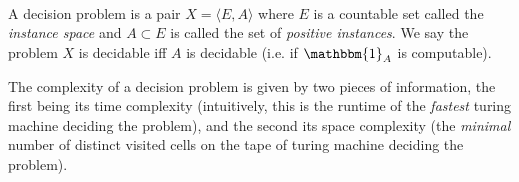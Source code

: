     \begin{definition}\ \\
        \label{def:decision-problem}
        A decision problem is a pair \(X = \langle E, A \rangle\) where \(E\) is a countable set called the \emph{instance space} and \(A \subset E\) is called the set of \emph{positive instances}. We say the problem \(X\) is decidable iff \(A\) is decidable (i.e. if \(\mathbbm{1}_A\) is computable).
    \end{definition}

    The complexity of a decision problem is given by two pieces of information, the first being its time complexity (intuitively, this is the runtime of the \emph{fastest} turing machine deciding the problem), and the second its space complexity (the \emph{minimal} number of distinct visited cells on the tape of turing machine deciding the problem).







